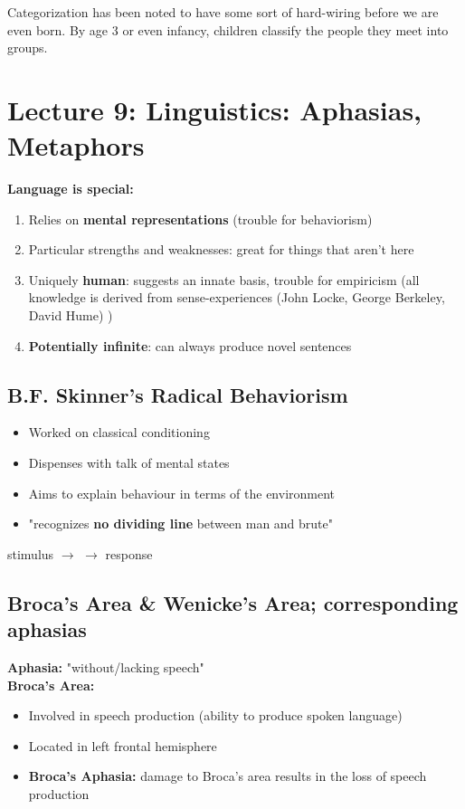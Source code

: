 \documentclass{article}
\begin{document}
Categorization has been noted to have some sort of hard-wiring before we are even born. By age 3 or even infancy, children classify the people they meet into groups. \\


\newpage 
\section{Lecture 9: Linguistics: Aphasias, Metaphors}

\textbf{Language is special:}
\begin{enumerate}
    \item Relies on \textbf{mental representations} (trouble for behaviorism) 
    \item Particular strengths and weaknesses: great for things that aren't here
    \item Uniquely \textbf{human}: suggests an innate basis, trouble for empiricism (all knowledge is derived from sense-experiences (John Locke, George Berkeley, David Hume) )
    \item \textbf{Potentially infinite}: can always produce novel sentences
\end{enumerate}

\subsection{B.F. Skinner's Radical Behaviorism}
\begin{itemize}
    \item Worked on classical conditioning 
    \item Dispenses with talk of mental states
    \item Aims to explain behaviour in terms of the environment
    \item "recognizes \textbf{no dividing line} between man and brute"
\end{itemize}
 
stimulus $\rightarrow$  $\rightarrow$ response

\subsection{Broca's Area \& Wenicke's Area; corresponding aphasias}
 
\textbf{Aphasia:} "without/lacking speech" \\
 
\noindent \textbf{Broca's Area:}
\begin{itemize}
    \item Involved in speech production (ability to produce spoken language) 
    \item Located in left frontal hemisphere
    \item \textbf{Broca's Aphasia:} damage to Broca's area results in the loss of speech production
\end{itemize}
 
\end{document}
